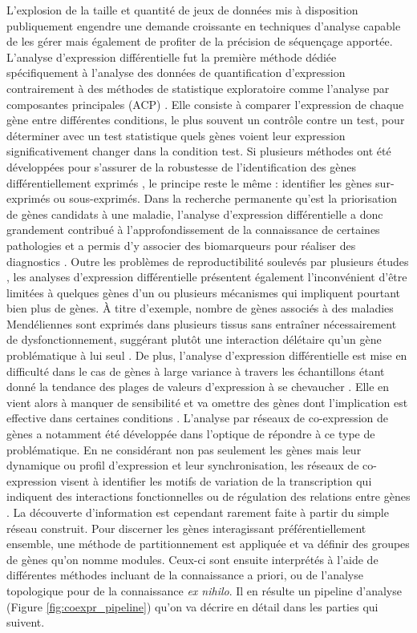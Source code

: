 L'explosion de la taille et quantité de jeux de données mis à disposition publiquement engendre une demande croissante en techniques d'analyse capable de les gérer mais également de profiter de la précision de séquençage apportée. L'analyse d'expression différentielle fut la première méthode dédiée spécifiquement à l'analyse des données de quantification d'expression contrairement à des méthodes de statistique exploratoire comme l'analyse par composantes principales (ACP) \cite{deKok2005Jan}. Elle consiste à comparer l'expression de chaque gène entre différentes conditions, le plus souvent un contrôle contre un test, pour déterminer avec un test statistique quels gènes voient leur expression significativement changer dans la condition test. Si plusieurs méthodes ont été développées pour s'assurer de la robustesse de l'identification des gènes différentiellement exprimés \cite{Soneson2013Dec,Spies2019Jan}, le principe reste le même : identifier les gènes sur-exprimés ou sous-exprimés. Dans la recherche permanente qu'est la priorisation de gènes candidats à une maladie, l'analyse d'expression différentielle a donc grandement contribué à l'approfondissement de la connaissance de certaines pathologies et a permis d'y associer des biomarqueurs pour réaliser des diagnostics \cite{Costa-Silva2017Dec}. Outre les problèmes de reproductibilité soulevés par plusieurs études \cite{Ostlund2014}, les analyses d'expression différentielle présentent 
également l'inconvénient d'être limitées à quelques gènes d'un ou plusieurs mécanismes qui impliquent pourtant bien plus de gènes. À titre d'exemple, nombre de gènes associés à des maladies Mendéliennes sont exprimés dans plusieurs tissus sans entraîner nécessairement de dysfonctionnement, suggérant plutôt une interaction délétaire qu'un gène problématique à lui seul \cite{Hekselman2020Mar}. De plus, l'analyse d'expression différentielle est mise en difficulté dans le cas de gènes à large variance à travers les échantillons étant donné la tendance des plages de valeurs d'expression à se chevaucher \cite{Ostlund2014}. Elle en vient alors à manquer de sensibilité et va omettre des gènes dont l'implication est effective dans certaines conditions \cite{delaFuente2010Jul}. L'analyse par réseaux de co-expression de gènes a notamment été développée dans l'optique de répondre à ce type de problématique. En ne considérant non pas seulement les gènes mais leur dynamique ou profil d'expression et leur synchronisation, les réseaux de co-expression visent à identifier les motifs de variation de la transcription qui indiquent des interactions fonctionnelles ou de régulation des relations entre gènes \cite{Parsana2019}. La découverte d'information est cependant rarement faite à partir du simple réseau construit. Pour discerner les gènes interagissant préférentiellement ensemble, une méthode de partitionnement est appliquée et va définir des groupes de gènes qu'on nomme \glspl{module}. Ceux-ci sont ensuite interprétés à l'aide de différentes méthodes incluant de la connaissance a priori, ou de l'analyse topologique pour de la connaissance \textit{ex nihilo}. Il en résulte un pipeline d'analyse (Figure \ref{fig:coexpr_pipeline}) \cite{Zhang2005a} qu'on va décrire en détail dans les parties qui suivent.


